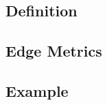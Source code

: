 \subsection{Definition}
\label{subsec:kgraph_definition}



\subsection{Edge Metrics}
\label{subsec:edge_metrics}
\subsection{Example}
\label{subsec:kgraph_example}


